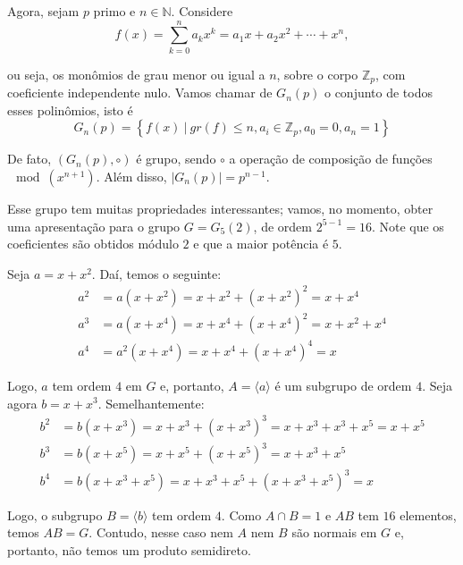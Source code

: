     	\par\vspace{0.3cm} Agora, sejam $p$ primo e $n\in\mathbb{N}$. Considere
    	\begin{equation*}
    	    f(x) = \sum_{k=0}^{n}a_kx^k = a_1x + a_2x^2 + \cdots + x^n, 
    	\end{equation*}
    	\par\vspace{0.3cm} ou seja, os monômios de grau menor ou igual a $n$, sobre o corpo $\mathbb{Z}_p$, 
    	com coeficiente independente nulo. Vamos chamar de $G_n(p)$ o conjunto de todos esses polinômios, 
    	isto é
    	\begin{equation*}
    	    G_n(p) = \left\{ f(x) \ | \ gr(f)\leq n, a_i\in\mathbb{Z}_p, a_0=0,a_n=1 \right\}
    	\end{equation*}
    	\par\vspace{0.3cm} De fato, $( G_n(p), \circ )$ é grupo, sendo $\circ$ a operação de composição 
    	de funções $\mod(x^{n+1})$. Além disso, $|G_n(p)| = p^{n-1}$.
    	
    	\par\vspace{0.3cm} Esse grupo tem muitas propriedades interessantes; vamos, no momento, 
    	obter uma apresentação para o grupo $G = G_5(2)$, de ordem $2^{5-1} = 16$. Note que os coeficientes 
    	são obtidos módulo $2$ e que a maior potência é $5$.
    	
    	\par\vspace{0.3cm} Seja $a = x+x^2$. Daí, temos o seguinte:
    	\begin{align*}
        	a^2 &= a(x+x^2) = x+x^2+(x+x^2)^2 = x+x^4 \\
        	a^3 &= a(x+x^4) = x+x^4+(x+x^4)^2 = x+x^2+x^4 \\
        	a^4 &= a^2(x+x^4) = x+x^4+(x+x^4)^4 = x
    	\end{align*}
    	\par\vspace{0.3cm} Logo, $a$ tem ordem $4$ em $G$ e, portanto, $A = \langle a \rangle$ é um 
    	subgrupo de ordem $4$. Seja agora $b = x+x^3$. Semelhantemente:
    	\begin{align*}
        	b^2 &= b(x+x^3) = x+x^3 + (x+x^3)^3 = x+x^3+x^3+x^5 = x+x^5 \\
        	b^3 &= b(x+x^5) = x+x^5+(x+x^5)^3 = x+x^3+x^5 \\
        	b^4 &= b(x+x^3+x^5) = x+x^3+x^5+(x+x^3+x^5)^3 = x
    	\end{align*}
    	\par\vspace{0.3cm} Logo, o subgrupo $B = \langle b \rangle$ tem ordem $4$. Como $A\cap B = 1$ e 
    	$AB$ tem $16$ elementos, temos $AB=G$. Contudo, nesse caso nem $A$ nem $B$ são normais em $G$ e, 
    	portanto, não temos um produto semidireto. 
    	
